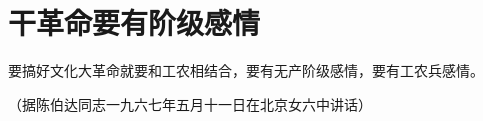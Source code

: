 \section[干革命要有阶级感情（一九六七年五月）]{干革命要有阶级感情}


要搞好文化大革命就要和工农相结合，要有无产阶级感情，要有工农兵感情。

{\raggedleft （据陈伯达同志一九六七年五月十一日在北京女六中讲话）\par}



